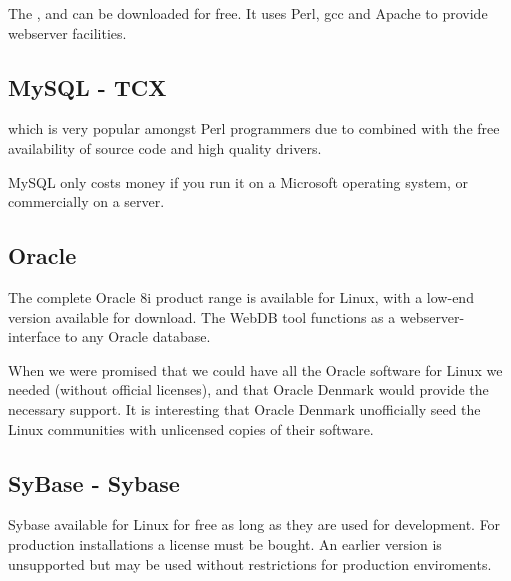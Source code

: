 The
, and can be downloaded for
free.  It uses Perl, gcc and Apache to provide webserver facilities.




\subsection{MySQL - TCX}
\label{sec:mysql}

 which is
very popular amongst Perl programmers due to
combined with the free availability of source code and high quality
drivers.

MySQL only costs money if you run it on a Microsoft operating system,
or commercially on a server.

\subsection{Oracle}
\label{sec:oracle}

The complete Oracle 8i product range is available for Linux, with a
low-end version available for download.  The WebDB tool functions as a
webserver-interface to any Oracle database.

When
 we were promised that we
could have all the Oracle software for Linux we needed (without
official licenses), and that Oracle Denmark would provide the
necessary support.  It is interesting that Oracle Denmark unofficially
seed the Linux communities with unlicensed copies of their software.

\subsection{SyBase - Sybase}

Sybase  available for
  Linux for free as long as they are used for development.  For
  production installations a license must be bought.  An earlier
  version is unsupported but may be used without restrictions for
  production enviroments.
  
